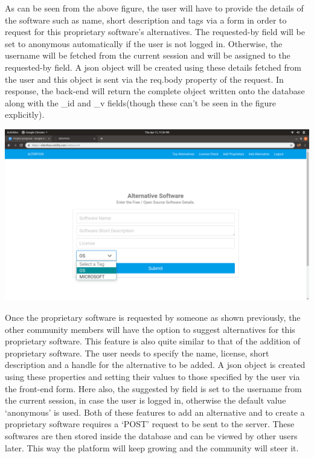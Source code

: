 As can be seen from the above figure, the user will have to provide the details of the software such as name, short description and tags via a form in order to request for this proprietary software's alternatives. The requested-by field will be set to anonymous automatically if the user is not logged in. Otherwise, the username will be fetched from the current session and will be assigned to the requested-by field. A json object will be created using these details fetched from the user and this object is sent via the req.body property of the request. In response, the back-end will return the complete object written onto the database along with the \_id and \_v fields(though these can't be seen in the figure explicitly).


\begin{center}
\includegraphics[scale=0.285]{images/4-7.png}
\end{center}


Once the proprietary software is requested by someone as shown previously, the other community members will have the option to suggest alternatives for this proprietary software. This feature is also quite similar to that of the addition of proprietary software. The user needs to specify the name, license, short description and a handle for the alternative to be added. A json object is created using these properties and setting their values to those specified by the user via the front-end form. Here also, the suggested by field is set to the username from the current session, in case the user is logged in, otherwise the default value ‘anonymous’ is used.
Both of these features to add an alternative and to create a proprietary software requires a ‘POST’ request to be sent to the server. These softwares are then stored inside the database and can be viewed by other users later. This way the platform will keep growing and the community will steer it.


